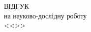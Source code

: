\begin{titlepage}
\begin{center}
	\MakeUppercase{Відгук} \\
	на науково-дослідну роботу \\
	<<\thetitle>>
\end{center}
\end{titlepage}

\begin{titlepage}

\end{titlepage}

\begin{titlepage}

\end{titlepage}

\begin{titlepage}

\end{titlepage}
